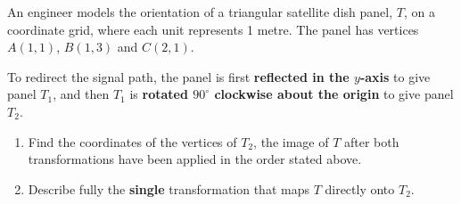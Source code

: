 \begin{question}
\noindent An engineer models the orientation of a triangular satellite dish panel, $T$, on a coordinate grid, where each unit represents 1 metre. The panel has vertices $A(1,1)$, $B(1,3)$ and $C(2,1)$.

\noindent To redirect the signal path, the panel is first \textbf{reflected in the $y$-axis} to give panel $T_1$, and then $T_1$ is \textbf{rotated $90^\circ$ clockwise about the origin} to give panel $T_2$.

\begin{center}
\end{center}

\begin{enumerate}
    \item[(a)] Find the coordinates of the vertices of $T_2$, the image of $T$ after both transformations have been applied in the order stated above.
    \vspace{5cm}

    \item[(b)] Describe fully the \textbf{single} transformation that maps $T$ directly onto $T_2$.
    \vspace{2.5cm}
\end{enumerate}
\end{question}
